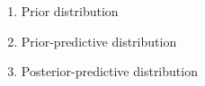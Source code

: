 \begin{enumerate}
    \item{Prior distribution}
    \item{Prior-predictive distribution}
    \item{Posterior-predictive distribution}
\end{enumerate}